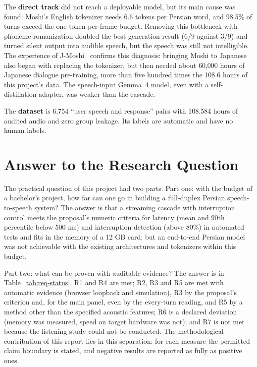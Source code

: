 The \textbf{direct track} did not reach a deployable model, but its main cause was found: Moshi's
English tokenizer needs 6.6 tokens per Persian word, and 98.5\% of turns exceed the
one-token-per-frame budget. Removing this bottleneck with phoneme romanization doubled the best
generation result (6/9 against 3/9) and turned silent output into audible speech, but the speech
was still not intelligible. The experience of J-Moshi~\cite{ohashi2025jmoshi} confirms this
diagnosis: bringing Moshi to Japanese also began with replacing the tokenizer, but then needed about
60,000 hours of Japanese dialogue pre-training, more than five hundred times the 108.6 hours of this
project's data. The speech-input Gemma~4 model, even with a self-distillation adapter, was weaker
than the cascade.

The \textbf{dataset} is 6,754 ``user speech and response'' pairs with 108.584 hours of audited audio
and zero group leakage. Its labels are automatic and have no human labels.

\section{Answer to the Research Question}
\label{sec:answer}

The practical question of this project had two parts. Part one: with the budget of a bachelor's
project, how far can one go in building a full-duplex Persian speech-to-speech system? The answer
is that a streaming cascade with interruption control meets the proposal's numeric criteria for
latency (mean and 90th percentile below 500 ms) and interruption detection (above 80\%) in automated
tests and fits in the memory of a 12 GB card; but an end-to-end Persian model was not achievable with
the existing architectures and tokenizers within this budget.

Part two: what can be proven with auditable evidence? The answer is in
Table~\ref{tab:req-status}. R1 and R4 are met; R2, R3 and R5 are met with automatic evidence
(browser loopback and simulation), R3 by the proposal's criterion and, for the main panel, even by
the every-turn reading, and R5 by a method other than the specified acoustic features; R6 is a
declared deviation (memory was measured, speed on target hardware was not); and R7 is not met because
the listening study could not be conducted. The methodological contribution of this report lies
in this separation: for each measure the permitted claim boundary is stated, and negative results are
reported as fully as positive ones.

